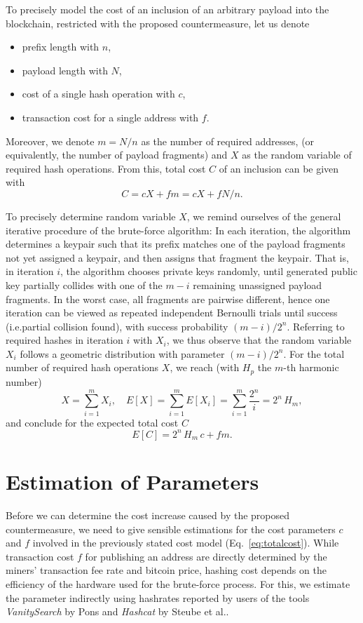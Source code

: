 \documentclass[a4paper,11pt,titlepage]{scrbook}
\begin{document}
To precisely model the cost of an inclusion of an arbitrary payload into the blockchain, restricted with the proposed countermeasure, let us denote 
\begin{itemize}[noitemsep]
    \item prefix length with $n$,
    \item payload length with $N$,
    \item cost of a single hash operation with $c$,
    \item transaction cost for a single address with $f$.
\end{itemize}
Moreover, we denote $m=N/n$ as the number of required addresses, (or equivalently, the number of payload fragments) and $X$ as the random variable of required hash operations.
From this, total cost $C$ of an inclusion can be given with
\[ C =  c X + fm = c X + fN/n . \]

To precisely determine random variable $X$, we remind ourselves of the general iterative procedure of the brute-force algorithm:
In each iteration, the algorithm determines a keypair such that its prefix matches one of the payload fragments not yet assigned a keypair, and then assigns that fragment the keypair.
That is, in iteration $i$, the algorithm chooses private keys randomly, until generated public key partially collides with one of the $m-i$ remaining unassigned payload fragments.
In the worst case, all fragments are pairwise different, hence one iteration can be viewed as repeated independent Bernoulli trials until success (i.e.\@ partial collision found), with success probability $(m-i)/2^n$.  
Referring to required hashes in iteration $i$ with $X_i$, we thus observe that the random variable $X_i$ follows a geometric distribution with parameter $(m-i)/2^n$.
For the total number of required hash operations $X$, we reach (with $H_p$ the $m$-th harmonic number)
\[ X = \sum_{i=1}^{m} X_i, \quad E[X] = \sum_{i=1}^{m} E[X_i] = \sum_{i=1}^{m}\frac{2^n}{i} = 2^n\, H_m, \]
and conclude for the expected total cost $C$
\begin{equation}
    E[C] = 2^n\, H_m\,c + fm.\label{eq:totalcost}
\end{equation}

\section{Estimation of Parameters}\label{sec:parameters}

Before we can determine the cost increase caused by the proposed countermeasure, we need to give sensible estimations for the cost parameters $c$ and $f$ involved in the previously stated cost model (Eq.~\ref{eq:totalcost}).
While transaction cost $f$ for publishing an address are directly determined by the miners' transaction fee rate and bitcoin price, hashing cost depends on the efficiency of the hardware used for the brute-force process.
For this, we estimate the parameter indirectly using hashrates reported by users of the tools \emph{VanitySearch} by Pons \cite{vanitysearch_2019} and \emph{Hashcat} by Steube et al.\@ \cite{hashcat_2020}.
\end{document}
